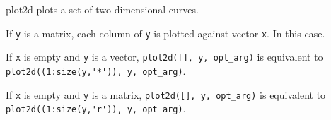 \begin{mandescription}
  plot2d plots a set of two dimensional curves.

  If \verb+y+ is a matrix, each column of \verb+y+ is plotted against vector
  \verb+x+. In this case.

  If \verb+x+ is empty and \verb+y+ is a vector, \verb+plot2d([], y, opt_arg)+ is
  equivalent to \verb|plot2d((1:size(y,'*')), y, opt_arg)|.

  If \verb+x+ is empty and \verb+y+ is a matrix, \verb+plot2d([], y, opt_arg)+ is
  equivalent to \verb|plot2d((1:size(y,'r')), y, opt_arg)|.  
\end{mandescription}

\begin{examples}
  \begin{program}
  \end{program}
\end{examples}

\begin{manseealso}
\end{manseealso}

